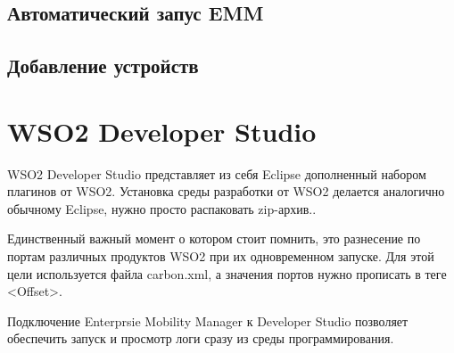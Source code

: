 \documentclass[a4paper, 12pt]{article}		%
\begin{document}
\subsection{Автоматический запус EMM}

\subsection{Добавление устройств}

\section{WSO2 Developer Studio}

WSO2 Developer Studio представляет из себя Eclipse дополненный набором плагинов от WSO2. Установка среды разработки от WSO2 делается аналогично обычному Eclipse, нужно просто распаковать zip-архив..

Единственный важный момент о котором стоит помнить, это разнесение по портам различных продуктов WSO2 при их одновременном запуске. Для этой цели используется файла carbon.xml, а значения портов нужно прописать в теге <Offset>.

Подключение Enterprsie Mobility Manager к Developer Studio позволяет обеспечить запуск и просмотр логи сразу из среды программирования.



\end{document}
